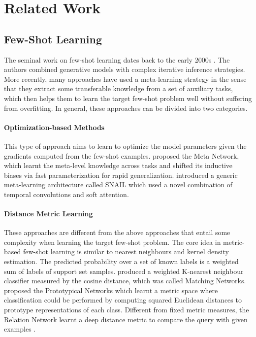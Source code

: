 \documentclass[11pt,a4paper]{article}
\begin{document}
\section{Related Work}
\subsection{Few-Shot Learning}
The seminal work on few-shot learning dates back to the early 2000s \citep{fe2003bayesian,fei2006one}. The authors combined generative models with complex iterative inference strategies. More recently, many approaches have used a meta-learning \citep{finn2017model,mishra2017simple} strategy in the sense that they extract some transferable knowledge from a set of auxiliary tasks, which then helps them to learn the target few-shot problem well without suffering from overfitting. In general, these approaches can be divided into two categories. 


\paragraph{Optimization-based Methods} This type of approach aims to learn to optimize the model parameters given the gradients computed from the few-shot examples. \citet{munkhdalai2017meta} proposed the Meta Network, which learnt the meta-level knowledge across tasks and shifted its inductive biases via fast parameterization for rapid generalization. \citet{mishra2017simple} introduced a generic meta-learning architecture called SNAIL which used a novel combination of temporal convolutions and soft attention.

\paragraph{Distance Metric Learning} These approaches are different from the above approaches that entail some complexity when learning the target few-shot problem. The core idea in metric-based few-shot learning is similar to nearest neighbours and kernel density estimation. The predicted probability over a set of known labels is a weighted sum of labels of support set samples. \citet{vinyals2016matching} produced a weighted K-nearest neighbour classifier measured by the cosine distance, which was called Matching Networks. \citet{snell2017prototypical} proposed the Prototypical Networks which learnt a metric space where classification could be performed by computing squared Euclidean distances to prototype representations of each class. Different from fixed metric measures, the Relation Network learnt a deep distance metric to compare the query with given examples \citep{sung2018learning}.
\end{document}

